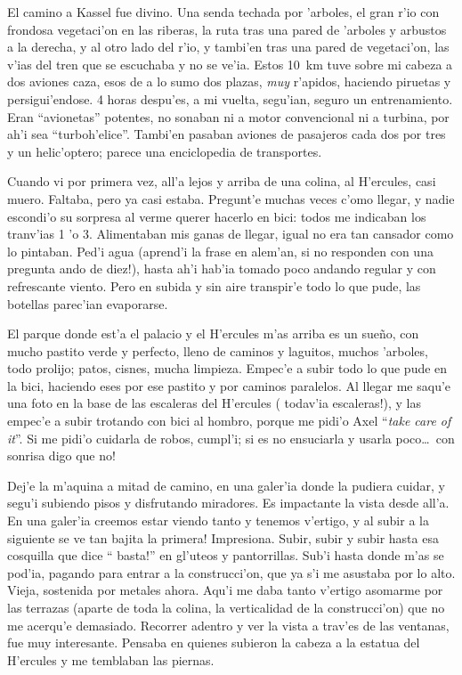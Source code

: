 El camino a Kassel fue divino. Una senda techada por 'arboles, el gran r'io con
frondosa vegetaci'on en las riberas, la ruta tras una pared de 'arboles y
arbustos a la derecha, y al otro lado del r'io, y tambi'en tras una pared de
vegetaci'on, las v'ias del tren que se escuchaba y no se ve'ia. Estos 10~km tuve
sobre mi cabeza a dos aviones caza, esos de a lo sumo dos plazas, \emph{muy}
r'apidos, haciendo piruetas y persigui'endose. 4 horas despu'es, a mi vuelta,
segu'ian, seguro un entrenamiento. Eran ``avionetas'' potentes, no sonaban ni a
motor convencional ni a turbina, por ah'i sea ``turboh'elice''. Tambi'en pasaban
aviones de pasajeros cada dos por tres y un helic'optero; parece una
enciclopedia de transportes.

Cuando vi por primera vez, all'a lejos y arriba de una colina, al H'ercules,
casi muero. Faltaba, pero ya casi estaba. Pregunt'e muchas veces c'omo llegar, y
nadie escondi'o su sorpresa al verme querer hacerlo en bici: todos me indicaban
los tranv'ias 1 'o 3. Alimentaban mis ganas de llegar, igual no era tan cansador
como lo pintaban. Ped'i agua (aprend'i la frase en alem'an, \textexclamdown si
no responden con una pregunta ando de diez!), hasta ah'i hab'ia tomado poco
andando regular y con refrescante viento. Pero en subida y sin aire transpir'e
todo lo que pude, las botellas parec'ian evaporarse.

El parque donde est'a el palacio y el H'ercules m'as arriba es un sue\~no, con
mucho pastito verde y perfecto, lleno de caminos y laguitos, muchos 'arboles,
todo prolijo; patos, cisnes, mucha limpieza. Empec'e a subir todo lo que pude en
la bici, haciendo eses por ese pastito y por caminos paralelos. Al llegar me
saqu'e una foto en la base de las escaleras del H'ercules (\textexclamdown
todav'ia escaleras!), y las empec'e a subir trotando con bici al hombro, porque
me pidi'o Axel ``\emph{take care of it}''. Si me pidi'o cuidarla de robos,
cumpl'i; si es no ensuciarla y usarla poco\ldots\ \textexclamdown con sonrisa
digo que no!

Dej'e la m'aquina a mitad de camino, en una galer'ia donde la pudiera cuidar, y
segu'i subiendo pisos y disfrutando miradores. Es impactante la vista desde
all'a. En una galer'ia creemos estar viendo tanto y tenemos v'ertigo,
\textexclamdown y al subir a la siguiente se ve tan bajita la primera!
Impresiona. Subir, subir y subir hasta esa cosquilla que dice ``\textexclamdown
basta!'' en gl'uteos y pantorrillas. Sub'i hasta donde m'as se pod'ia, pagando
 para entrar a la construcci'on, que ya s'i me asustaba por lo
alto. Vieja, sostenida por metales ahora. Aqu'i me daba tanto v'ertigo asomarme
por las terrazas (aparte de toda la colina, la verticalidad de la construcci'on)
que no me acerqu'e demasiado. Recorrer adentro y ver la vista a trav'es de las
ventanas, fue muy interesante. Pensaba en quienes subieron la cabeza a la
estatua del H'ercules y me temblaban las piernas.

